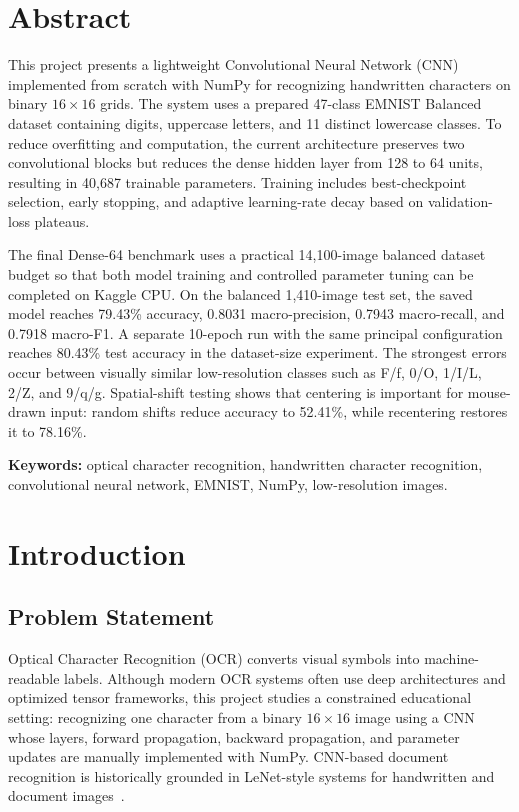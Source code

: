 \documentclass[a4paper,12pt]{extreport}
\begin{document}
\chapter*{Abstract}
This project presents a lightweight Convolutional Neural Network (CNN) implemented from scratch with NumPy for recognizing handwritten characters on binary $16\times16$ grids. The system uses a prepared 47-class EMNIST Balanced dataset containing digits, uppercase letters, and 11 distinct lowercase classes. To reduce overfitting and computation, the current architecture preserves two convolutional blocks but reduces the dense hidden layer from 128 to 64 units, resulting in 40,687 trainable parameters. Training includes best-checkpoint selection, early stopping, and adaptive learning-rate decay based on validation-loss plateaus.

The final Dense-64 benchmark uses a practical 14,100-image balanced dataset budget so that both model training and controlled parameter tuning can be completed on Kaggle CPU. On the balanced 1,410-image test set, the saved model reaches 79.43\% accuracy, 0.8031 macro-precision, 0.7943 macro-recall, and 0.7918 macro-F1. A separate 10-epoch run with the same principal configuration reaches 80.43\% test accuracy in the dataset-size experiment. The strongest errors occur between visually similar low-resolution classes such as F/f, 0/O, 1/I/L, 2/Z, and 9/q/g. Spatial-shift testing shows that centering is important for mouse-drawn input: random shifts reduce accuracy to 52.41\%, while recentering restores it to 78.16\%.

\noindent\textbf{Keywords:} optical character recognition, handwritten character recognition, convolutional neural network, EMNIST, NumPy, low-resolution images.

\tableofcontents
\clearpage
{}

\chapter{Introduction}

\section{Problem Statement}
Optical Character Recognition (OCR) converts visual symbols into machine-readable labels. Although modern OCR systems often use deep architectures and optimized tensor frameworks, this project studies a constrained educational setting: recognizing one character from a binary $16\times16$ image using a CNN whose layers, forward propagation, backward propagation, and parameter updates are manually implemented with NumPy. CNN-based document recognition is historically grounded in LeNet-style systems for handwritten and document images~\cite{lecun1998gradient}.
\end{document}
